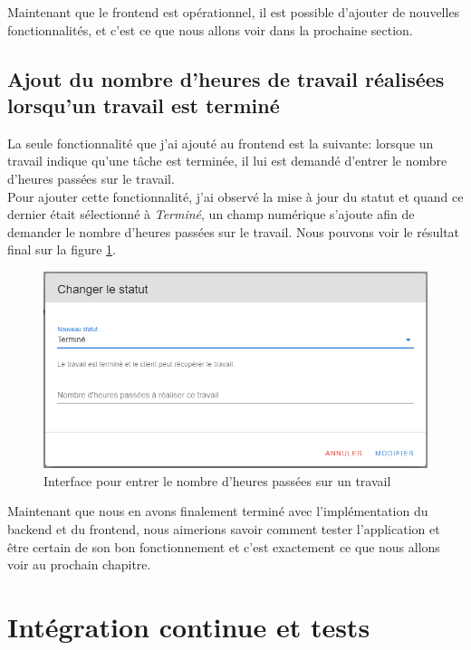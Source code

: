 \documentclass[
    iai, %
    il, %
]{heig-tb}
\begin{document}
Maintenant que le \Gls{frontend} est opérationnel, il est possible d'ajouter de nouvelles fonctionnalités, et c'est ce que nous allons voir dans la prochaine section.

\section{Ajout du nombre d'heures de travail réalisées lorsqu'un travail est terminé}
La seule fonctionnalité que j'ai ajouté au \Gls{frontend} est la suivante: lorsque un travail indique qu'une tâche est terminée, il lui est demandé d'entrer le nombre d'heures passées sur le travail. \\
Pour ajouter cette fonctionnalité, j'ai observé la mise à jour du statut et quand ce dernier était sélectionné à \emph{Terminé}, un champ numérique s'ajoute afin de demander le nombre d'heures passées sur le travail. Nous pouvons voir le résultat final sur la figure \ref{nb-worked-hours}.

\begin{center}
    \begin{figure}[H]
        \includegraphics[width=\textwidth]{./assets/figures/nb-worked-hours.png}
        \caption{Interface pour entrer le nombre d'heures passées sur un travail \label{nb-worked-hours}}
    \end{figure}
\end{center}

Maintenant que nous en avons finalement terminé avec l'implémentation du \Gls{backend} et du \Gls{frontend}, nous aimerions savoir comment tester l'application et être certain de son bon fonctionnement et c'est exactement ce que nous allons voir au prochain chapitre.

\chapter{Intégration continue et tests}
\end{document}
